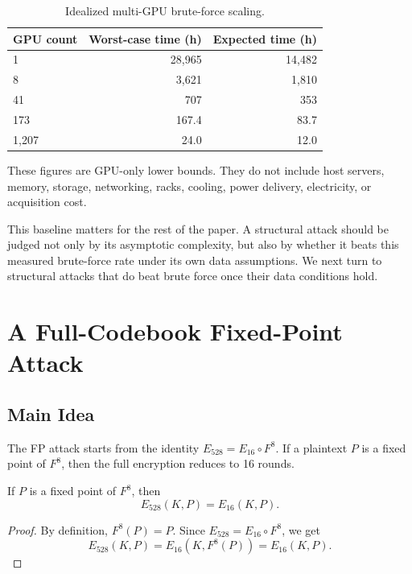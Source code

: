 \documentclass[version=preprint]{iacrcc}
\begin{document}
\begin{table}[htbp]
  \centering
  \caption{Idealized multi-GPU brute-force scaling.}
  \label{tab:bruteforce-scaling}
  \setlength{\tabcolsep}{4pt}
  \renewcommand{\arraystretch}{1.05}
  \begin{tabular}{@{}lrr@{}}
    \toprule
    GPU count & Worst-case time (h) & Expected time (h) \\
    \midrule
    1 & 28,965 & 14,482 \\
    8 & 3,621 & 1,810 \\
    41 & 707 & 353 \\
    173 & 167.4 & 83.7 \\
    1,207 & 24.0 & 12.0 \\
    \bottomrule
  \end{tabular}
\end{table}

These figures are GPU-only lower bounds.
They do not include host servers, memory, storage, networking, racks, cooling, power delivery, electricity, or acquisition cost.

This baseline matters for the rest of the paper.
A structural attack should be judged not only by its asymptotic complexity, but also by whether it beats this measured brute-force rate under its own data assumptions.
We next turn to structural attacks that do beat brute force once their data conditions hold.

\section{A Full-Codebook Fixed-Point Attack}\label{sec:fixedpoint}

\subsection{Main Idea}

The FP attack starts from the identity $E_{528} = E_{16} \circ F^8$.
If a plaintext $P$ is a fixed point of $F^8$, then the full encryption reduces to 16 rounds.

\begin{lemma}\label{lem:fixedpoint-reduction}
If $P$ is a fixed point of $F^8$, then
\[
E_{528}(K,P) = E_{16}(K,P).
\]
\end{lemma}

\begin{proof}
By definition, $F^8(P)=P$.
Since $E_{528}=E_{16}\circ F^8$, we get
\[
E_{528}(K,P) = E_{16}(K,F^8(P)) = E_{16}(K,P).
\]
\end{proof}
\end{document}
